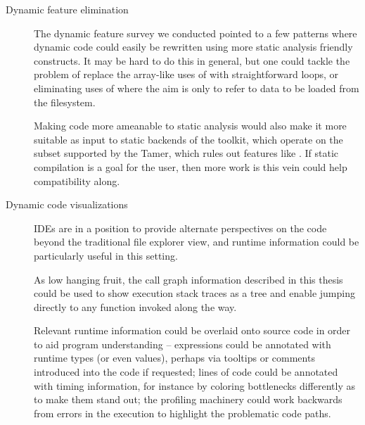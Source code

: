 \begin{description}

\item[Dynamic feature elimination] The dynamic feature survey we conducted
pointed to a few patterns where dynamic code could easily be rewritten using
more static analysis friendly constructs. It may be hard to do this in
general, but one could tackle the problem of replace the array-like uses of
 with straightforward loops, or eliminating uses of 
where the aim is only to refer to data to be loaded from the filesystem.

Making code more ameanable to static analysis would also make it more suitable
as input to static backends of the \mclab toolkit, which operate on the \matlab
subset supported by the \matlab Tamer, which rules out features like
. If static compilation is a goal for the user, then more work is
this vein could help compatibility along.

\item[Dynamic code visualizations] IDEs are in a position to provide alternate
perspectives on the code beyond the traditional file explorer view, and runtime
information could be particularly useful in this setting.

As low hanging fruit, the call graph information described in this thesis could
be used to show execution stack traces as a tree and enable jumping directly to
any function invoked along the way.

Relevant runtime information could be overlaid onto source code in order to aid
program understanding -- expressions could be annotated with runtime types (or
even values), perhaps via tooltips or comments introduced into the code if
requested; lines of code could be annotated with timing information, for
instance by coloring bottlenecks differently as to make them stand out; the
profiling machinery could work backwards from errors in the execution to
highlight the problematic code paths.

\end{description}
